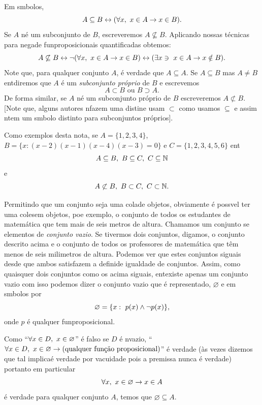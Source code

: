 Em s\ih mbolos,
\[
A \subseteq B \leftrightarrow (\forall x,\textrm{ } x\in A \to x\in B).
\]
Se $A$ n\ao \'e um subconjunto de $B$, escreveremos $A\not\subseteq B$. Aplicando nossas t\'ecnicas para nega\cao de fun\coes proposicionais quantificadas obtemos:
\[
A\not\subseteq B \leftrightarrow \lnot(\forall x,\textrm{ } x\in A \to x\in B) \leftrightarrow (\exists x \ni \textrm{ } x\in A \to x\notin B).
\]
Note que, para qualquer conjunto $A$, \'e verdade que $A \subseteq A$. Se $A \subseteq B$ mas $A\neq B$ ent\ao diremos que $A$ \'e um {\it subconjunto pr\'oprio} de $B$ e escrevemos
\[
A\subset B \textrm{ ou } B\supset A.
\] 
De forma similar, se $A$ n\ao \'e um subconjunto pr\'oprio de $B$ escreveremos $A\not\subset B$. [Note que, alguns autores n\ao fazem uma distin\cao e usam $\subset$ como usamos $\subseteq$ e assim n\ao tem um s\ih mbolo distinto para subconjuntos pr\'oprios].

Como exemplos desta nota\caoi, se $A=\{1,2,3,4\}$, $B= \{x: (x-2)(x-1)(x-4)(x-3)=0\}$ e $C=\{1,2,3,4,5,6\}$ ent\ao
\[
A\subseteq B, \textrm{ } B\subseteq C, \textrm{ } C\subseteq \mathbb{N}
\]
e
\[
A\not\subset B, \textrm{ } B\subset C, \textrm{ } C\subset \mathbb{N}.
\]

Permitindo que um conjunto seja uma cola\cao de objetos, obviamente \'e poss\ih vel ter uma cole\cao sem objetos, poe exemplo, o conjunto de todos os estudantes de matem\'atica que tem mais de seis metros de altura. Chamamos um conjunto se elementos de {\it conjunto vazio}. Se tivermos dois conjuntos, digamos, o conjunto descrito acima e o conjunto de todos os professores de matem\'atica que t\^em menos de seis milimetros de altura. Podemos ver que estes conjuntos s\ao iguais desde que ambos satisfazem a defini\cao de igualdade de conjuntos. Assim, como quaisquer dois conjuntos como os acima s\ao iguais, ent\ao existe apenas um conjunto vazio com isso podemos dizer o conjunto vazio que \'e representado, $\varnothing$ e em s\ih mbolos por
\[
\varnothing = \{x: \textrm{ } p(x)\wedge \lnot p(x)\},
\]  
onde $p$ \'e qualquer fun\cao proposicional.

Como ``$\forall x\in D,\textrm{ } x\in\varnothing$'' \'e falso se $D$ \'e n\ao vazio, ``$\forall x\in D,\espaco x\in\varnothing\to \textrm{(qualquer fun\cao proposicional)}$'' \'e verdade (\`as vezes dizemos que tal implica\cao \'e verdade por vacuidade pois a premissa nunca \'e verdade) portanto em particular
\[
\forall x, \textrm{ } x\in\varnothing\to x\in A
\] 
\'e verdade para qualquer conjunto $A$, temos que $\varnothing\subseteq A.$

